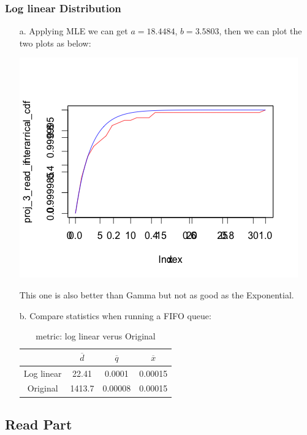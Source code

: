 \documentclass[11pt]{article}
\begin{document}
\subsubsection{Log linear Distribution}
\begin{enumerate}
\item[a.]
Applying MLE we can get $a=18.4484$, $b=3.5803$, then we can plot the two plots as below:
\begin{center}
\includegraphics[scale=0.5]{write_log_cdf.png}
\end{center}
This one is also better than Gamma but not as good as the Exponential.


\item[b.]
Compare statistics when running a FIFO queue:
\begin{table}[htdp]
\caption{metric: log linear verus Original}
\begin{center}
\begin{tabular}{c|c|c|c}
	& $\overline{d}$ & $\overline{q}$ & $\overline{x}$ \\
\hline
Log linear & 22.41 & 0.0001 & 0.00015 \\
\hline
Original &1413.7 & 0.00008 & 0.00015
\end{tabular}
\end{center}
\label{default}
\end{table}%
\end{enumerate}

\subsection{Read Part}
\end{document}
